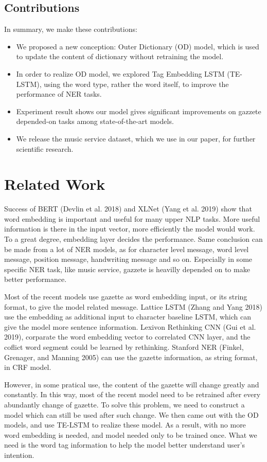 \documentclass[letterpaper]{article} %
\begin{document}
\subsection{Contributions}

In summary, we make these contributions:

\begin{itemize}
\item We proposed a new conception: Outer Dictionary (OD) model, which is used to update the content of dictionary without retraining the model.
\item In order to realize OD model, we explored Tag Embedding LSTM (TE-LSTM), using the word type, rather the word itself, to improve the performance of NER tasks.
\item Experiment result shows our model gives significant improvements on gazzete depended-on tasks among state-of-the-art models.
\item We release the music service dataset, which we use in our paper, for further scientific research.
\end{itemize}

\section{Related Work}
Success of BERT (Devlin et al. 2018) and XLNet (Yang et al. 2019) show that word embedding is important and useful for many upper NLP tasks. More useful information is there in the input vector, more efficiently the model would work. To a great degree, embedding layer decides the performance. Same conclusion can be made from a lot of NER models, as for character level message, word level message, position message, handwriting message and so on. Especially in some specific NER task, like music service,	 gazzete is heavilly depended on to make better performance. 

Most of the recent models use gazette as word embedding input, or its string format, to give the model related message. Lattice LSTM (Zhang and Yang 2018) use the embedding as additional input to character baseline LSTM, which can give the model more sentence information. Lexivon Rethinking CNN (Gui et al. 2019), corparate the word embedding vector to correlated CNN layer, and the coflict word segment could be learned by rethinking. Stanford NER (Finkel, Grenager, and Manning 2005) can use the gazette information, as string format, in CRF model.

However, in some pratical use, the content of the gazette will change greatly and constantly. In this way, most of the recent model need to be retrained after every abundantly change of gazette. To solve this problem, we need to construct a model which can still be used after such change. We then came out with the OD models, and use TE-LSTM to realize these model. As a result, with no more word embedding is needed, and model needed only to be trained once.  What we need is the word tag information to help the model better understand user's intention.
\end{document}
